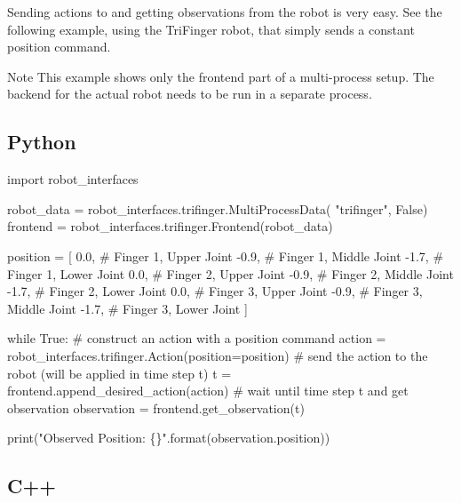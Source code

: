Sending actions to and getting observations from the robot is very easy. See the following example, using the Tri\+Finger robot, that simply sends a constant position command.

\begin{DoxyNote}{Note}
This example shows only the frontend part of a multi-\/process setup. The backend for the actual robot needs to be run in a separate process.
\end{DoxyNote}
\subsection*{Python}


\begin{DoxyCode}
\textcolor{keyword}{import} robot\_interfaces

robot\_data = robot\_interfaces.trifinger.MultiProcessData(
    \textcolor{stringliteral}{"trifinger"}, \textcolor{keyword}{False})
frontend = robot\_interfaces.trifinger.Frontend(robot\_data)

position = [
     0.0,  \textcolor{comment}{# Finger 1, Upper Joint}
    -0.9,  \textcolor{comment}{# Finger 1, Middle Joint}
    -1.7,  \textcolor{comment}{# Finger 1, Lower Joint}
     0.0,  \textcolor{comment}{# Finger 2, Upper Joint}
    -0.9,  \textcolor{comment}{# Finger 2, Middle Joint}
    -1.7,  \textcolor{comment}{# Finger 2, Lower Joint}
     0.0,  \textcolor{comment}{# Finger 3, Upper Joint}
    -0.9,  \textcolor{comment}{# Finger 3, Middle Joint}
    -1.7,  \textcolor{comment}{# Finger 3, Lower Joint}
]

\textcolor{keywordflow}{while} \textcolor{keyword}{True}:
    \textcolor{comment}{# construct an action with a position command}
    action = robot\_interfaces.trifinger.Action(position=position)
    \textcolor{comment}{# send the action to the robot (will be applied in time step t)}
    t = frontend.append\_desired\_action(action)
    \textcolor{comment}{# wait until time step t and get observation}
    observation = frontend.get\_observation(t)

    print(\textcolor{stringliteral}{"Observed Position: \{\}"}.format(observation.position))
\end{DoxyCode}


\subsection*{C++}


